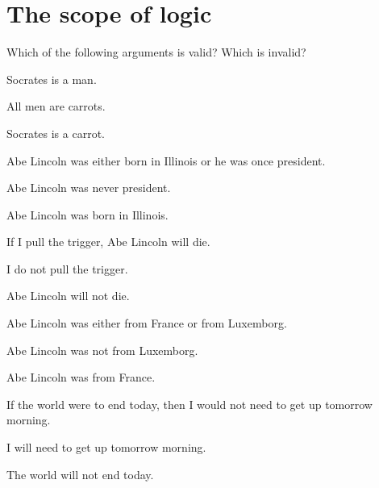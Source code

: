 \chapter{The scope of logic}
\setcounter{ProbPart}{0}
\problempart
Which of the following arguments is valid? Which is invalid?
\begin{compactlist}
\item\begin{earg}
\item Socrates is a man.
\item All men are carrots.
\item[\texttherefore]  Socrates is a carrot. \hfill {}
\end{earg}

\item\begin{earg}
\item Abe Lincoln was either born in Illinois or he was once president.
\item Abe Lincoln was never president.
\item[\texttherefore] Abe Lincoln was born in Illinois. \hfill {}
\end{earg}

\item\begin{earg}
\item If I pull the trigger, Abe Lincoln will die.
\item I do not pull the trigger.
\item[\texttherefore] Abe Lincoln will not die. \hfill {}
\end{earg}

\item\begin{earg}
\item Abe Lincoln was either from France or from Luxemborg.
\item Abe Lincoln was not from Luxemborg.
\item[\texttherefore] Abe Lincoln was from France. \hfill {}
\end{earg}

\item\begin{earg}
\item If the world were to end today, then I would not need to get up tomorrow morning.
\item I will need to get up tomorrow morning.
\item[\texttherefore] The world will not end today. \hfill {}
\end{earg}


\end{compactlist}
